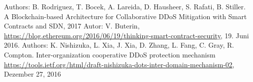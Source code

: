 \begin{thebibliography}{99}

 Authors: B. Rodriguez, T. Bocek, A. Lareida, D. Hausheer, S. Rafati, B. Stiller. A Blockchain-based Architecture for Collaborative DDoS Mitigation with Smart Contracts and SDN, 2017
 Autor: V. Buterin, \url{https://blog.ethereum.org/2016/06/19/thinking-smart-contract-security}, 19. Juni 2016.
Authors: K. Nishizuka, L. Xia, J. Xia, D. Zhang, L. Fang, C. Gray, R. Compton. Inter-organization cooperative DDoS protection mechanism \url{https://tools.ietf.org/html/draft-nishizuka-dots-inter-domain-mechanism-02}, Dezember 27, 2016
\end{thebibliography}

